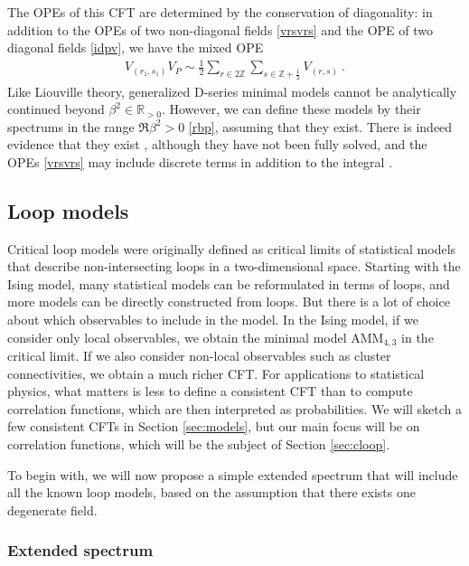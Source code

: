 \documentclass[12pt, a4paper]{article}
\theoremstyle{break}
\begin{document}
The OPEs of this CFT are determined by the conservation of diagonality: in addition to the OPEs of two non-diagonal fields \eqref{vrsvrs} and the OPE of two diagonal fields \eqref{idpv}, we have the mixed OPE 
\begin{align}
 V_{(r_1,s_1)}V_P \sim \frac12 \sum_{r\in 2\mathbb{Z}}\sum_{s\in \mathbb{Z}+\frac12} V_{(r,s)} \ . 
\end{align}
Like Liouville theory, generalized D-series minimal models cannot be analytically continued beyond $\beta^2\in \mathbb{R}_{>0}$. However, we can define these models by their spectrums in the range $\Re\beta^2>0$ \eqref{rbp}, assuming that they exist. There is indeed evidence that they exist \cite{mr17}, although they have not been fully solved, and the OPEs \eqref{vrsvrs} may include discrete terms in addition to the integral \cite{rib19}. 


\subsection{Loop models}

Critical loop models were originally defined as critical limits of statistical models that describe non-intersecting loops in a two-dimensional space. Starting with the Ising model, many statistical models can be reformulated in terms of loops, and more models can be directly constructed from loops. But there is a lot of choice about which observables to include in the model. In the Ising model, if we consider only local observables, we obtain the minimal model $\text{AMM}_{4,3}$ in the critical limit. If we also consider non-local observables such as cluster connectivities, we obtain a much richer CFT. For applications to statistical physics, what matters is less to define a consistent CFT than to compute correlation functions, which are then interpreted as probabilities. We will sketch a few consistent CFTs in Section \ref{sec:models}, but our main focus will be on correlation functions, which will be the subject of Section \ref{sec:cloop}.

To begin with, we will now propose a simple extended spectrum that will include all the known loop models, based on the assumption that there exists one degenerate field. 

\subsubsection{Extended spectrum}
\end{document}

